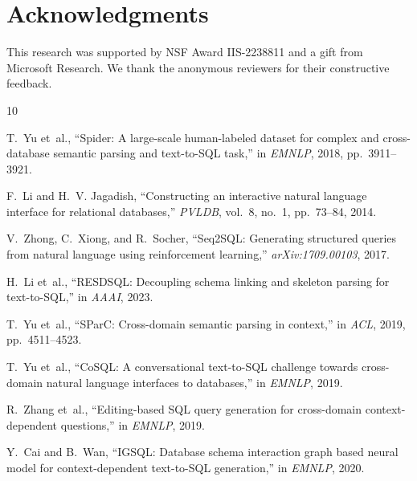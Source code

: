 \documentclass[sigconf,nonacm]{acmart}
\begin{document}
\section*{Acknowledgments}

This research was supported by NSF Award IIS-2238811 and a gift from Microsoft Research. We thank the anonymous reviewers for their constructive feedback.


% 

\begin{thebibliography}{10}

T.~Yu et~al., ``Spider: A large-scale human-labeled dataset for complex and cross-database semantic parsing and text-to-SQL task,'' in \textit{EMNLP}, 2018, pp.~3911--3921.

F.~Li and H.~V. Jagadish, ``Constructing an interactive natural language interface for relational databases,'' \textit{PVLDB}, vol.~8, no.~1, pp.~73--84, 2014.

V.~Zhong, C.~Xiong, and R.~Socher, ``Seq2SQL: Generating structured queries from natural language using reinforcement learning,'' \textit{arXiv:1709.00103}, 2017.

H.~Li et~al., ``RESDSQL: Decoupling schema linking and skeleton parsing for text-to-SQL,'' in \textit{AAAI}, 2023.

T.~Yu et~al., ``SParC: Cross-domain semantic parsing in context,'' in \textit{ACL}, 2019, pp.~4511--4523.

T.~Yu et~al., ``CoSQL: A conversational text-to-SQL challenge towards cross-domain natural language interfaces to databases,'' in \textit{EMNLP}, 2019.

R.~Zhang et~al., ``Editing-based SQL query generation for cross-domain context-dependent questions,'' in \textit{EMNLP}, 2019.

Y.~Cai and B.~Wan, ``IGSQL: Database schema interaction graph based neural model for context-dependent text-to-SQL generation,'' in \textit{EMNLP}, 2020.

\end{thebibliography}
\end{document}
